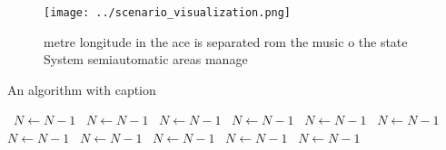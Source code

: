 \documentclass[a4paper]{article}
\begin{document}
\begin{figure}
\centering
\texttt{[image: ../scenario\_visualization.png]}
\caption{metre longitude in the ace is separated rom the music o the state System semiautomatic areas manage
}
\end{figure}
 
\begin{algorithm}
\caption{An algorithm with caption}
\begin{algorithmic}
\    \State $N \gets N - 1$
\    \State $N \gets N - 1$
\    \State $N \gets N - 1$
\    \State $N \gets N - 1$
\    \State $N \gets N - 1$
\    \State $N \gets N - 1$
\    \State $N \gets N - 1$
\    \State $N \gets N - 1$
\    \State $N \gets N - 1$
\    \State $N \gets N - 1$
\    \State $N \gets N - 1$
\EndWhile
\end{algorithmic}
\end{algorithm}
\end{document}
